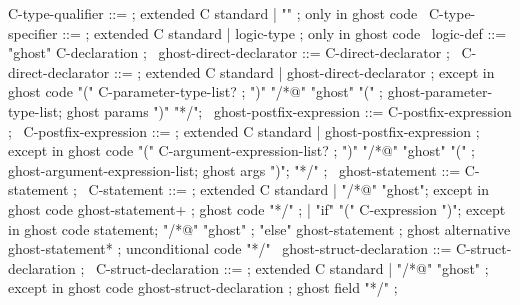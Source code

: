 \begin{syntax}

  C-type-qualifier ::= ; extended C standard
    | "\ghost" ; only in ghost code
  \
  C-type-specifier ::= ; extended C standard
    | {logic-type}  ; only in ghost code
  \
  logic-def ::= "ghost" C-declaration ;
  \
  ghost-direct-declarator ::= C-direct-declarator ;
  \
  C-direct-declarator ::= ; extended C standard
    | ghost-direct-declarator ; except in ghost code
      "(" C-parameter-type-list? ;
      ")" "/*@" "ghost" "(" ;
          ghost-parameter-type-list; ghost params
      ")" "*/";
  \
  ghost-postfix-expression ::= C-postfix-expression ;
  \
  C-postfix-expression ::= ; extended C standard
    | ghost-postfix-expression ; except in ghost code
      "(" C-argument-expression-list? ;
       ")" "/*@" "ghost" "(" ;
           ghost-argument-expression-list; ghost args
       ")";
      "*/" ;
   \
  ghost-statement ::= C-statement ;
  \
  C-statement ::= ; extended C standard
    | "/*@" "ghost"; except in ghost code
            ghost-statement+ ; ghost code
      "*/" ;
    | "if" "(" C-expression ")"; except in ghost code
       statement;
       "/*@" "ghost" ;
             "else" ghost-statement ; ghost alternative
        ghost-statement* ; unconditional code
      "*/"
  \
  ghost-struct-declaration ::= C-struct-declaration ;
  \
  C-struct-declaration ::= ; extended C standard
  | {"/*@" "ghost" }; except in ghost code
          {ghost-struct-declaration} ; ghost field
    {"*/"} ;

\end{syntax}

